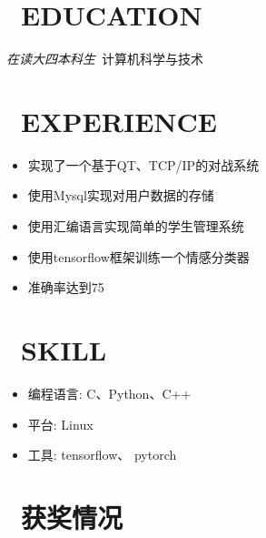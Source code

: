 \documentclass{resume}
\begin{document}


 
\section{\faGraduationCap\  EDUCATION}
\textit{在读大四本科生}\ 计算机科学与技术

\section{\faUsers\ EXPERIENCE}
\role{C++, QT}{学校大作业}
\begin{itemize}
  \item 实现了一个基于QT、TCP/IP的对战系统
  \item 使用Mysql实现对用户数据的存储
\end{itemize}

\begin{itemize}
  \item 使用汇编语言实现简单的学生管理系统
\end{itemize}

\begin{itemize}
  \item 使用tensorflow框架训练一个情感分类器
  \item 准确率达到75%
\end{itemize}



\section{\faCogs\ SKILL}
\begin{itemize}[parsep=0.5ex]
  \item 编程语言: C、Python、C++
  \item 平台: Linux
  \item 工具: tensorflow、 pytorch
\end{itemize}

\section{\faHeartO\ 获奖情况}

%
%
\end{document}
